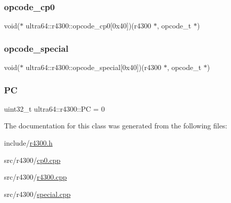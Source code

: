 \subsubsection{\texorpdfstring{opcode\+\_\+cp0}{opcode\_cp0}}
{\footnotesize\ttfamily void($\ast$ ultra64\+::r4300\+::opcode\+\_\+cp0\mbox{[}0x40\mbox{]})(r4300 $\ast$, opcode\+\_\+t $\ast$)\hspace{0.3cm}{\ttfamily [private]}}

\mbox{\label{classultra64_1_1r4300_aa2150b1c7f087ae60b2073c76e3b9ddf}} 
\subsubsection{\texorpdfstring{opcode\+\_\+special}{opcode\_special}}
{\footnotesize\ttfamily void($\ast$ ultra64\+::r4300\+::opcode\+\_\+special\mbox{[}0x40\mbox{]})(r4300 $\ast$, opcode\+\_\+t $\ast$)\hspace{0.3cm}{\ttfamily [private]}}

\mbox{\label{classultra64_1_1r4300_a71741e855672becf47a53076f5eb181e}} 
\subsubsection{\texorpdfstring{PC}{PC}}
{\footnotesize\ttfamily uint32\+\_\+t ultra64\+::r4300\+::\+PC = 0\hspace{0.3cm}{\ttfamily [private]}}



The documentation for this class was generated from the following files\+:\begin{DoxyCompactItemize}
\item 
include/\hyperlink{r4300_8h}{r4300.\+h}\item 
src/r4300/\hyperlink{cp0_8cpp}{cp0.\+cpp}\item 
src/r4300/\hyperlink{r4300_8cpp}{r4300.\+cpp}\item 
src/r4300/\hyperlink{special_8cpp}{special.\+cpp}\end{DoxyCompactItemize}

